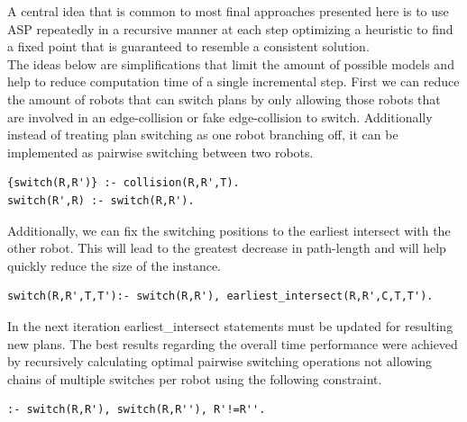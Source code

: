 \documentclass{llncs}
\begin{document}
A central idea that is common to most final approaches presented here is to use ASP repeatedly in a recursive manner at each step optimizing a heuristic to find a fixed point that is guaranteed to resemble a consistent solution.\\
The ideas below are simplifications that limit the amount of possible models and help to reduce computation time of a single incremental step.
First we can reduce the amount of robots that can switch plans by only allowing those robots that are involved in an edge-collision or fake edge-collision to switch. Additionally instead of treating plan switching as one robot branching off, it can be implemented as pairwise switching between two robots.
\begin{verbatim}
{switch(R,R')} :- collision(R,R',T).
switch(R',R) :- switch(R,R').
\end{verbatim}
Additionally, we can fix the switching positions to the earliest intersect with the other robot. This will lead to the greatest decrease in path-length and will help quickly reduce the size of the instance.
\begin{verbatim}
switch(R,R',T,T'):- switch(R,R'), earliest_intersect(R,R',C,T,T').
\end{verbatim}
In the next iteration earliest\_intersect statements must be updated for resulting new plans. The best results regarding the overall time performance were achieved by recursively calculating optimal pairwise switching operations not allowing chains of multiple switches per robot using the following constraint.
\begin{verbatim}
:- switch(R,R'), switch(R,R''), R'!=R''.
\end{verbatim}
\end{document}
